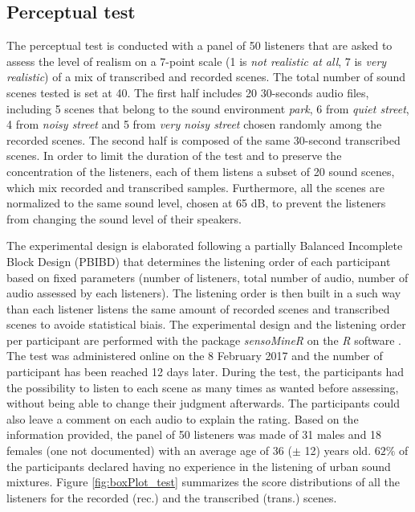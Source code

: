 \documentclass[review,5p,twocolumn,sort&compress,times]{elsarticle}
\begin{document}
\subsection{Perceptual test}
The perceptual test is conducted with a panel of 50 listeners that are asked to assess the level of realism on a 7-point scale (1 is \textit{not realistic at all}, 7 is \textit{very realistic}) of a mix of transcribed and recorded scenes. The total number of sound scenes tested is set at 40. The first half includes 20 30-seconds audio files, including 5 scenes that belong to the sound environment \textit{park}, 6 from \textit{quiet street}, 4 from \textit{noisy street} and 5 from \textit{very noisy street} chosen randomly among the recorded scenes. The second half is composed of the same 30-second transcribed scenes. In order to limit the duration of the test and to preserve the concentration of the listeners, each of them listens a subset of 20 sound scenes, which mix recorded and transcribed samples. Furthermore, all the scenes are normalized to the same sound level, chosen at 65 dB, to prevent the listeners from changing the sound level of their speakers.

The experimental design is elaborated following a partially Balanced Incomplete Block Design (PBIBD) \cite{john1977optimal} that determines the listening order of each participant based on fixed parameters (number of listeners, total number of audio, number of audio assessed by each listeners). The listening order is then built in a such way than each listener listens the same amount of recorded scenes and transcribed scenes to avoide statistical biais. The experimental design and the listening order per participant are performed with the package \textit{sensoMineR} on the \textit{R} software \cite{le_sensominer:_2008}.\\

The test was administered online on the 8 February 2017 and the number of participant has been reached 12 days later. During the test, the participants had the possibility to listen to each scene as many times as wanted before assessing, without being able to change their judgment afterwards. The participants could also leave a comment on each audio to explain the rating. Based on the information provided, the panel of 50 listeners was made of 31 males and 18 females (one not documented) with an average age of 36 ($\pm$ 12) years old. $62\%$ of the participants declared having no experience in the listening of urban sound mixtures. Figure \ref{fig:boxPlot_test} summarizes the score distributions of all the listeners for the recorded (rec.) and the transcribed (trans.) scenes. 
\end{document}
